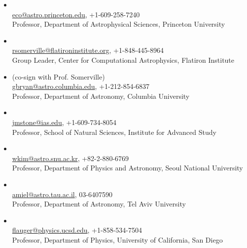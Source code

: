 \documentclass[12pt,preprint,letter]{aastex63}
\begin{document}
\begin{itemize}%
\item \subtitle{Eve C. Ostriker} \\
\url{eco@astro.princeton.edu}, +1-609-258-7240\\
Professor, Department of Astrophysical Sciences, Princeton University

\item \subtitle{Rachel S. Somerville} \\
\url{rsomerville@flatironinstitute.org}, +1-848-445-8964\\
Group Leader, Center for Computational Astrophysics, Flatiron Institute

\item \subtitle{Greg L. Bryan} (co-sign with Prof. Somerville) \\
\url{gbryan@astro.columbia.edu}, +1-212-854-6837\\
Professor, Department of Astronomy, Columbia University

\item \subtitle{James M. Stone} \\
\url{jmstone@ias.edu}, +1-609-734-8054\\
Professor, School of Natural Sciences, Institute for Advanced Study 

\item \subtitle{Woong-Tae Kim} \\
\url{wkim@astro.snu.ac.kr}, +82-2-880-6769\\
Professor, Department of Physics and Astronomy, Seoul National University 

\item \subtitle{Amiel Sternberg} \\
\url{amiel@astro.tau.ac.il}, 03-6407590\\
Professor, Department of Astronomy, Tel Aviv University

\item \subtitle{Raphael Flauger} \\
\url{flauger@physics.ucsd.edu}, +1-858-534-7504\\
Professor, Department of Physics, University of California, San Diego

\end{itemize}
\end{document}
